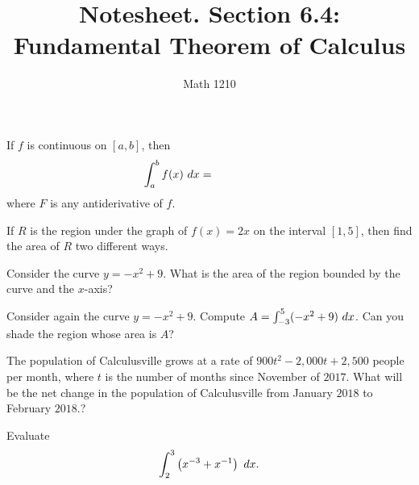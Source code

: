 \documentclass[12pt, a4paper]{article}
\author{Math 1210}
\title{Notesheet. Section 6.4: Fundamental Theorem of Calculus}
\date{}
\begin{document}
\maketitle
\nameline
\begin{thrm}
  If $f$ is continuous on $[a,b]$, then
  $$\int_a^b f(x) \ d x = \hphantom{F(b) - F(a)}$$
  where $F$ is any antiderivative of $f$.
\end{thrm}
\begin{ex}
  If $R$ is the region under the graph of $f(x) = 2x$ on the interval $[1, 5]$, then find the area of $R$ two different ways.
\end{ex}
\begin{ex}
  Consider the curve $y = -x^2 + 9$.  What is the area of the region bounded by the curve and the $x$-axis?
\end{ex}
\pagebreak
\begin{ex}
  Consider again the curve $y = -x^2 + 9$.  Compute $A = \int_{-3}^{5} (-x^2 + 9) \ d x$.  Can you shade the region whose area is $A$?
\end{ex}
\begin{ex}
  The population of Calculusville grows at a rate of $900t^2 - 2{,}000t + 2{,}500$ people per month, where $t$ is the number of months since November of $2017$.  What will be the net change in the population of Calculusville from January $2018$ to February $2018$.?
\end{ex}
\begin{ex}
  Evaluate $$\int_2^3 \left(x^{-3} + x^{-1}\right) \ d x.$$
\end{ex}
\end{document}

